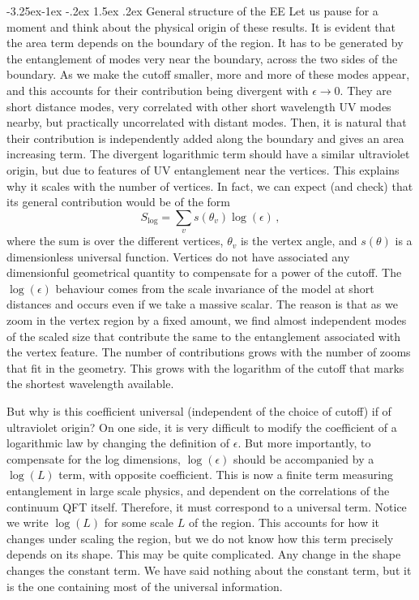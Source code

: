 \documentclass[11pt]{article}
\makeatletter
\renewcommand\subsection{\@startsection{subsection}{2}{\z@}%
                                   {-3.25ex\@plus -1ex \@minus -.2ex}%
                                     {1.5ex \@plus .2ex}%
                                     {\normalfont\bfseries}}
\numberwithin{equation}{section}
\newcommand{\be}{\begin{equation}}
\newcommand{\ee}{\end{equation}}
\makeatother
\begin{document}
\subsection{General structure of the EE}
\label{ge}
Let us pause for a moment and think about the physical origin of these results. It is evident that the area term depends on the boundary of the region. It has to be generated by the entanglement of modes very near the boundary, across the two sides of the boundary. As we make the cutoff smaller, more and more of these modes appear, and this accounts for their contribution being divergent with $\epsilon\rightarrow 0$. They are short distance modes, very correlated with other short wavelength UV modes nearby, but practically uncorrelated with distant modes. Then, it is natural that their contribution is independently added along the boundary and gives an area increasing term. The divergent logarithmic term should have a similar ultraviolet origin, but due to features of UV entanglement near the vertices. 
This explains why it scales with the number of vertices. In fact, we can expect (and check) that its general contribution would be of the form
\be
S_{\log}=\sum_{v} s(\theta_v) \log(\epsilon)\,,
\ee
where the sum is over the different vertices, $\theta_v$ is the vertex angle, and $s(\theta)$ is a dimensionless universal function. Vertices do not have associated any dimensionful geometrical quantity to compensate for a power of the cutoff.  The $\log(\epsilon)$ behaviour comes from the scale invariance of the model at short distances and occurs even if we take a massive scalar. The reason is that as we zoom in the vertex region by a fixed amount, we find almost independent modes of the scaled size that contribute the same to the entanglement associated with the vertex feature. The number of contributions grows with the number of zooms that fit in the geometry. This grows with the logarithm of the cutoff that marks the shortest wavelength available.  

 But why is this coefficient universal (independent of the choice of cutoff) if of ultraviolet origin? On one side, it is very difficult to modify the coefficient of a logarithmic law by changing the definition of $\epsilon$. But more importantly, to compensate for the log dimensions, $\log(\epsilon)$ should be accompanied by a $\log(L)$ term,  with opposite coefficient. This is now a finite term measuring entanglement in large scale physics, and dependent on the correlations of the continuum QFT itself. Therefore, it must correspond to a universal term. Notice we write $\log(L)$ for some scale $L$ of the region. This accounts for how it changes under scaling the region,  but we do not know how this term precisely depends on its shape. This may be quite complicated. Any change in the shape changes the constant term. We have said nothing about the constant term, but it is the one containing most of the universal information.       
\end{document}
